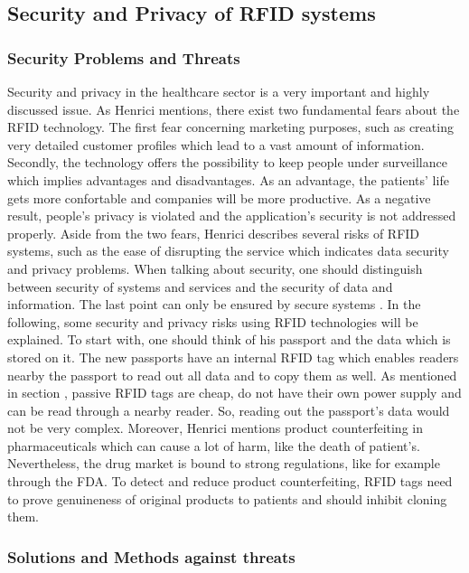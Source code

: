 \subsection{Security and Privacy of RFID systems}

\subsubsection{Security Problems and Threats}
Security and privacy in the healthcare sector is a very important and highly discussed issue. As Henrici \cite{henrici} mentions, there exist two fundamental fears about the RFID technology. The first fear concerning marketing purposes, such as creating very detailed customer profiles which lead to a vast amount of information. Secondly, the technology offers the possibility to keep people under surveillance which implies advantages and disadvantages. As an advantage, the patients' life gets more confortable and companies will be more productive. As a negative result, people's privacy is violated and the application's security is not addressed properly.
Aside from the two fears, Henrici describes several risks of RFID systems, such as the ease of disrupting the service which indicates data security and privacy problems. When talking about security, one should distinguish between security of systems and services and the security of data and information. The last point can only be ensured by secure systems \cite{henrici}. 
In the following, some security and privacy risks using RFID technologies will be explained. To start with, one should think of his passport and the data which is stored on it. The new passports have an internal RFID tag which enables readers nearby the passport to read out all data and to copy them as well. As mentioned in section \pageref{tags}, passive RFID tags are cheap, do not have their own power supply and can be read through a nearby reader. So, reading out the passport's data would not be very complex.
Moreover, Henrici mentions product counterfeiting in pharmaceuticals which can cause a lot of harm, like the death of patient's. Nevertheless, the drug market is bound to strong regulations, like for example through the \ac{FDA}. To detect and reduce product counterfeiting, RFID tags need to prove genuineness of original products to patients and should inhibit cloning them.

\subsubsection{Solutions and Methods against threats}



